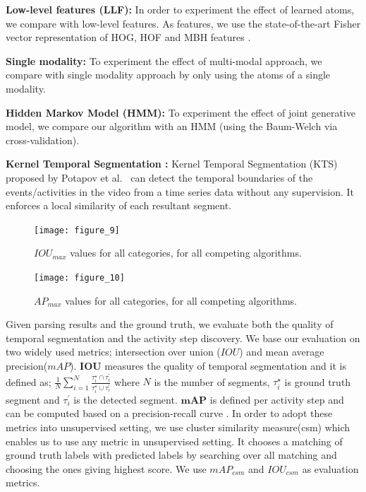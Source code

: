 \noindent\textbf{Low-level features (LLF):}
In order to experiment the effect of learned atoms, we compare with low-level features. As features, we use the state-of-the-art Fisher vector representation of HOG, HOF and MBH features \cite{THUMOS14}.

\noindent\textbf{Single modality:}
To experiment the effect of multi-modal approach, we compare with single modality approach by only using the atoms of a single modality.

\noindent\textbf{Hidden Markov Model (HMM):}
To experiment the effect of joint generative model, we compare our algorithm with an HMM (using the Baum-Welch \cite{rabiner} via cross-validation).


\noindent\textbf{Kernel Temporal Segmentation \cite{potapov2014category}:}
Kernel Temporal Segmentation (KTS) proposed by Potapov et al.~\cite{potapov2014category} can detect the temporal boundaries of the events/activities in the video from a time series data without any supervision. It enforces a local similarity of each resultant segment.

\begin{figure}[t]
  \texttt{[image: figure\_9]}
  \vspace{-9mm}
  \caption{$IOU_{max}$ values for all categories, for all competing algorithms.}
  \label{mIOU}
\texttt{[image: figure\_10]}
\vspace{-9mm}
\caption{$AP_{max}$ values for all categories, for all competing algorithms.}
\vspace{-3mm}
\label{mmAP}
\end{figure}

Given parsing results and the ground truth, we evaluate both the quality of temporal segmentation and the activity step discovery. We base our evaluation on two widely used metrics; intersection over union ($IOU$) and mean average precision($mAP$). $\mathbf{IOU}$ measures the quality of temporal segmentation and it is defined as; $\frac{1}{N}\sum_{i=1}^N \frac{\tau^\star_i \cap \tau^\prime_{i}}{\tau^\star_i \cup \tau^\prime_{i}}$ where $N$ is the number of segments, $\tau^\star_i$ is ground truth  segment and $\tau^\prime_{i}$ is the detected segment. $\mathbf{mAP}$ is defined per activity step and can be computed based on a precision-recall curve \cite{THUMOS14}. In order to adopt these metrics into unsupervised setting, we use cluster similarity measure(csm)\cite{liao05} which enables us to use any metric in unsupervised setting. It chooses a matching of ground truth labels with predicted labels by searching over all matching and choosing the ones giving highest score. We use $mAP_{csm}$ and $IOU_{csm}$ as evaluation metrics.


